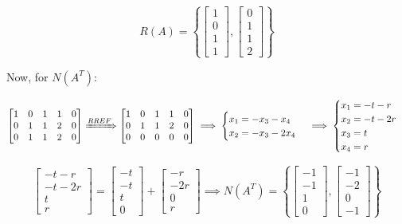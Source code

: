 \documentclass{report}
\begin{document}
$$
R(A) = \left\{ \begin{bmatrix} 1 \\ 0 \\ 1 \\ 1 \end{bmatrix}, \begin{bmatrix} 0 \\ 1 \\ 1 \\ 2 \end{bmatrix} \right\}
$$

Now, for $N(A^T)$:

$$
\begin{bmatrix} 1 & 0 & 1 & 1 & 0 \\ 0 & 1 & 1 & 2 & 0 \\ 0 & 1 & 1 & 2 & 0 \end{bmatrix} \xRightarrow{RREF} \begin{bmatrix} 1 & 0 & 1 & 1 & 0 \\ 0 & 1 & 1 & 2 & 0 \\ 0 & 0 & 0 & 0 & 0 \end{bmatrix} \implies \begin{cases} x_1 = -x_3 - x_4 \\ x_2 = -x_3 - 2x_4 \end{cases} \implies \begin{cases} x_1 = -t - r \\ x_2 = -t - 2r  \\ x_3 = t \\ x_4 = r \end{cases}
$$

$$
\begin{bmatrix} -t - r \\ -t - 2r \\ t \\ r \end{bmatrix} = \begin{bmatrix} -t \\ -t \\ t \\ 0 \end{bmatrix} + \begin{bmatrix} -r \\ -2r \\ 0 \\ r \end{bmatrix} \implies N(A^T) = \left\{ \begin{bmatrix} -1 \\ -1 \\ 1 \\ 0 \end{bmatrix}, \begin{bmatrix}-1 \\ -2 \\ 0 \\ -1 \end{bmatrix} \right\}
$$
\end{document}
